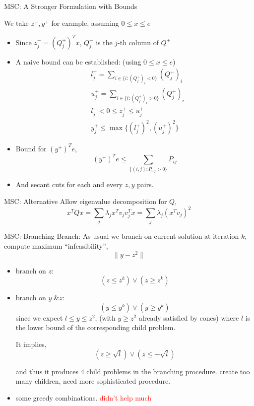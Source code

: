\begin{frame}{MSC: A Stronger Formulation with Bounds}

  We take \(z^+, y^+\) for example, assuming \(0\le x\le e\)
  \begin{itemize}
    \item Since \(z^+_j = (Q^+_j)^T x\), \(Q^+_j\) is the \(j\)-th column of \(Q^+\)
    \item A naive bound can be established: (using \(0 \le x \le e\))
          \[\begin{aligned}
               & l^+_j = \sum_{i\in\{i: (Q^+_j)_i < 0\}} (Q^+_j)_i \\
               & u^+_j = \sum_{i\in\{i: (Q^+_j)_i > 0\}} (Q^+_j)_i \\
               & l^+_j < 0 \le z^+_j \le  u^+_j                    \\
               & y^+_j \le \max \{(l^+_j)^2, (u^+_j)^2\}
            \end{aligned}
          \]
    \item Bound for \((y^+)^T e\),
          \[(y^+)^T e \le \sum_{\{(i,j): P_{i,j} > 0 \}} P_{ij} \]
    \item And secant cuts for each and every \(z, y\) pairs.
  \end{itemize}

\end{frame}

\begin{frame}{MSC: Alternative}
  Allow eigenvalue decomposition for \(Q\),
  \[x^TQx = \sum_j \lambda_j x^Tv_jv_j^Tx = \sum_j \lambda_j (x^Tv_j)^2\]

\end{frame}

\begin{frame}{MSC: Branching}
  Branch:
  As usual we branch on current solution at iteration \(k\), compute maximum ``infeasibility'',
  \[ \|y - z^2\|\]
  \begin{itemize}
    \item branch on \(z\):
          \[ \left(z \le z^k \right)  \vee \left(z \ge z^k \right)  \]
    \item branch on \(y\; \& z\):
          \[ \left(y \le y^k  \right)  \vee \left (y \ge y^k \right)  \]
          since we expect \(l \le y \le z^2\), (with \(y \ge z^2\) already satisfied by cones)
          where \(l\) is the lower bound of the corresponding child problem.

          It implies,
          \[
            \left(z \ge \sqrt{l} \right) \vee \left( z \le -\sqrt{l} \right)
          \]

          and thus it produces 4 child problems in the branching procedure.
          create too many children, need more sophisticated procedure.
    \item some greedy combinations. \textcolor{red}{didn't help much}
  \end{itemize}
\end{frame}

